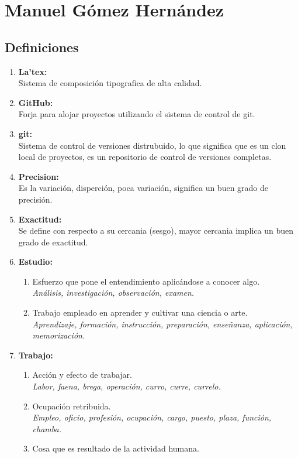 \section{Manuel Gómez Hernández}
\subsection{Definiciones}

\begin{enumerate} 
\item \textbf{La'tex: }
     \\Sistema de composición tipografica de alta calidad.

\item \textbf{GitHub: }
    \\Forja para alojar proyectos utilizando el sistema de control de git.

\item \textbf{git: }
    \\Sistema de control de versiones distrubuido, lo que significa que es un clon local de proyectos, es un repositorio de control de versiones completas.

\item \textbf{Precision: }
    \\Es la variación, disperción, poca variación, significa un buen grado de precisión.

\item \textbf{Exactitud: }
    \\Se define con respecto a su cercania (sesgo), mayor cercania implica un buen grado de exactitud.

\item \textbf{Estudio: } 
\begin{enumerate}
\item Esfuerzo que pone el entendimiento aplicándose a conocer algo.
\\ \textit{Análisis, investigación, observación, examen.}
\item Trabajo empleado en aprender y cultivar una ciencia o arte.
\\ \textit{Aprendizaje, formación, instrucción, preparación, enseñanza, aplicación, memorización.}
\cite{RAE}
\end{enumerate}

\item \textbf{Trabajo: }
\begin{enumerate}
    \item Acción y efecto de trabajar.
    \\ \textit{Labor, faena, brega, operación, curro, curre, currelo.}
    \item Ocupación retribuida.
    \\ \textit{Empleo, oficio, profesión, ocupación, cargo, puesto, plaza, función, chamba.}
    \item Cosa que es resultado de la actividad humana.
    \\ \cite{RAE}
\end{enumerate}


\end{enumerate}
